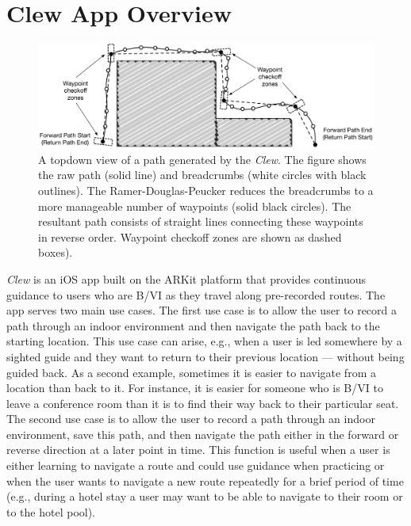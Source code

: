 \documentclass[chi_draft]{sigchi}
\newcommand{\BVI}{B/VI\xspace}
\begin{document}
\section{Clew App Overview}\label{sec:clewoverview}

\begin{figure}
\begin{center}
\includegraphics[width=\linewidth]{Figures/samplepath}
\end{center}
\caption{A topdown view of a path generated by the \emph{Clew}.  The figure shows the raw path (solid line) and breadcrumbs (white circles with black outlines).  The Ramer-Douglas-Peucker reduces the breadcrumbs to a more manageable number of waypoints (solid black circles).  The resultant path consists of straight lines connecting these waypoints in reverse order.  Waypoint checkoff zones are shown as dashed boxes).\label{fig:samplepath}}
\end{figure}

\emph{Clew} is an iOS app built on the ARKit platform that provides continuous guidance to users who are \BVI as they travel along pre-recorded routes.  The app serves two main use cases.  The first use case is to allow the user to record a path through an indoor environment and then navigate the path back to the starting location.  This use case can arise, e.g., when a user is led somewhere by a sighted guide and they want to return to their previous location --- without being guided back.  As a second example, sometimes it is easier to navigate from a location than back to it.  For instance, it is easier for someone who is \BVI to leave a conference room than it is to find their way back to their particular seat.  The second use case is to allow the user to record a path through an indoor environment, save this path, and then navigate the path either in the forward or reverse direction at a later point in time.  This function is useful when a user is either learning to navigate a route and could use guidance when practicing or when the user wants to navigate a new route repeatedly for a brief period of time (e.g., during a hotel stay a user may want to be able to navigate to their room or to the hotel pool).
\end{document}
